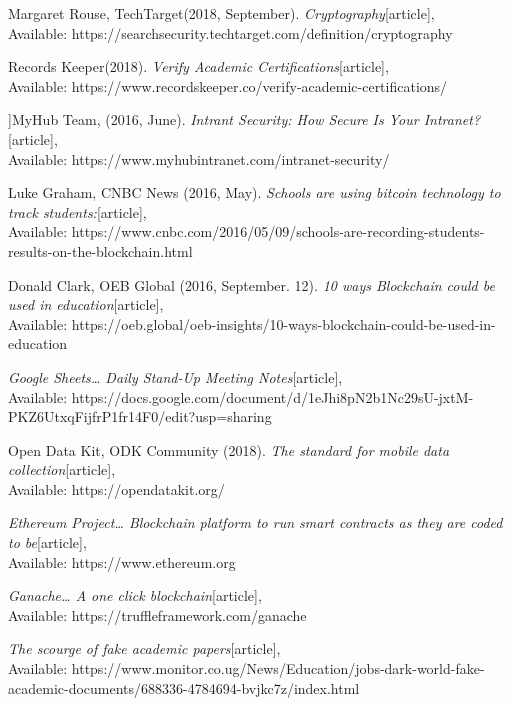\begin{thebibliography}{10}

Margaret Rouse, TechTarget(2018, September).
\emph{Cryptography}[article],\\
Available: {https://searchsecurity.techtarget.com/definition/cryptography}

 Records Keeper(2018).
\emph{Verify Academic Certifications}[article],\\
Available: {https://www.recordskeeper.co/verify-academic-certifications/}

]MyHub Team, (2016, June).
\emph{Intrant Security: How Secure Is Your Intranet?}[article],\\
Available: {https://www.myhubintranet.com/intranet-security/}

Luke Graham, CNBC News (2016, May).
\emph{Schools are using bitcoin technology to track students:}[article],\\
Available: {https://www.cnbc.com/2016/05/09/schools-are-recording-students-results-on-the-blockchain.html}

Donald Clark, OEB Global (2016, September. 12).
\emph{10 ways Blockchain could be used in education}[article],\\
Available: {https://oeb.global/oeb-insights/10-ways-blockchain-could-be-used-in-education}

\emph{Google Sheets… Daily Stand-Up Meeting Notes}[article],\\
Available: {https://docs.google.com/document/d/1eJhi8pN2b1Nc29sU-jxtM-PKZ6UtxqFijfrP1fr14F0/edit?usp=sharing}

 Open Data Kit, ODK Community (2018).
\emph{The standard for mobile data collection}[article],\\
Available: {https://opendatakit.org/}


\emph{Ethereum Project… Blockchain platform to run smart contracts as they are coded to be}[article],\\
Available: {https://www.ethereum.org}

\emph{Ganache… A one click blockchain}[article],\\
Available: {https://truffleframework.com/ganache}

\emph{The scourge of fake academic papers}[article],\\
Available: {https://www.monitor.co.ug/News/Education/jobs-dark-world-fake-academic-documents/688336-4784694-bvjkc7z/index.html}


\end{thebibliography}
